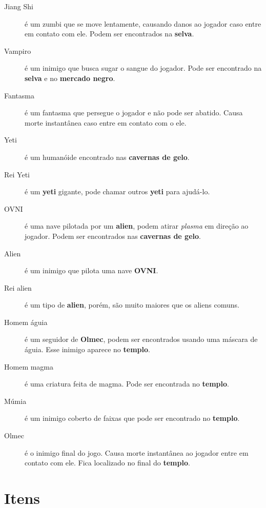 \begin{description}
    \item[Jiang Shi]
        é um zumbi que se move lentamente, causando danos ao jogador caso entre
        em contato com ele. Podem ser encontrados na \textbf{selva}.
    \item[Vampiro]
        é um inimigo que busca sugar o sangue do jogador. Pode ser encontrado
        na \textbf{selva} e no \textbf{mercado negro}.
    \item[Fantasma]
        é um fantasma que persegue o jogador e não pode ser abatido. Causa
        morte instantânea caso entre em contato com o ele.
    \item[Yeti]
        é um humanóide encontrado nas \textbf{cavernas de gelo}.
    \item[Rei Yeti]
        é um \textbf{yeti} gigante, pode chamar outros \textbf{yeti} para
        ajudá-lo.
    \item[OVNI]
        é uma nave pilotada por um \textbf{alien}, podem atirar \textit{plasma}
        em direção ao jogador. Podem ser encontrados nas \textbf{cavernas de
        gelo}.
    \item[Alien]
        é um inimigo que pilota uma nave \textbf{OVNI}.
    \item[Rei alien]
        é um tipo de \textbf{alien}, porém, são muito maiores que os aliens
        comuns.
    \item[Homem águia]
        é um seguidor de \textbf{Olmec}, podem ser encontrados usando uma
        máscara de águia. Esse inimigo aparece no \textbf{templo}.
    \item[Homem magma]
        é uma criatura feita de magma. Pode ser encontrada no \textbf{templo}.
    \item[Múmia]
        é um inimigo coberto de faixas que pode ser encontrado no
        \textbf{templo}.
    \item[Olmec]
        é o inimigo final do jogo. Causa morte instantânea ao jogador entre em
        contato com ele. Fica localizado no final do \textbf{templo}.
\end{description}

\section{\label{section:spelunky-items}Itens}

